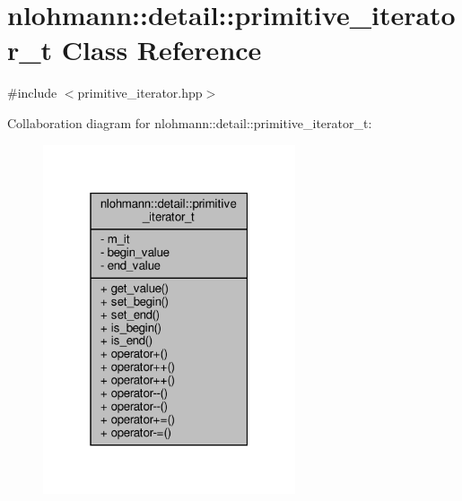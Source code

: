 \hypertarget{classnlohmann_1_1detail_1_1primitive__iterator__t}{}\section{nlohmann\+:\+:detail\+:\+:primitive\+\_\+iterator\+\_\+t Class Reference}
\label{classnlohmann_1_1detail_1_1primitive__iterator__t}


{\ttfamily \#include $<$primitive\+\_\+iterator.\+hpp$>$}



Collaboration diagram for nlohmann\+:\+:detail\+:\+:primitive\+\_\+iterator\+\_\+t\+:\nopagebreak
\begin{figure}[H]
\begin{center}
\leavevmode
\includegraphics[width=211pt]{classnlohmann_1_1detail_1_1primitive__iterator__t__coll__graph}
\end{center}
\end{figure}
